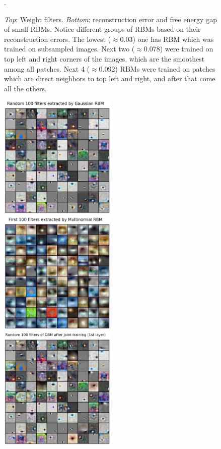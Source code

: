 \begin{figure}[h]
\begin{mdframed}
\caption{\emph{Top}: Weight filters. \emph{Bottom}: reconstruction error and free energy gap of small RBMs. Notice different groups of RBMs based on their reconstruction errors. The lowest ($\approx$0.03) one has RBM which was trained on subsampled images. Next two ($\approx$0.078) were trained on top left and right corners of the images, which are the smoothest among all patches. Next 4 ($\approx$0.092) RBMs were trained on patches which are direct neighbors to top left and right, and after that come all the others.}.
\end{mdframed}
\end{figure}

\clearpage
\begin{figure}[h]
\begin{mdframed}
\centering
\includegraphics[width=2.2in]{dbm-cifar-latest/grbm.png}
\quad
\includegraphics[width=2.2in]{dbm-cifar-latest/mrbm.png}
\\[2em]
\includegraphics[width=2.2in]{dbm-cifar-latest/W1_joint.png}

\end{mdframed}
\end{figure}
